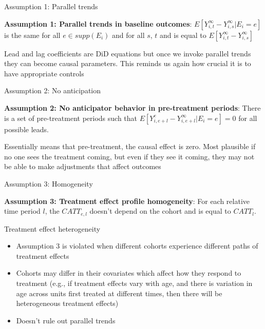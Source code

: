 \documentclass{beamer}
\begin{document}
\begin{frame}{Assumption 1: Parallel trends}

\textbf{Assumption 1: Parallel trends in baseline outcomes}: $E[Y^{\infty}_{i,t} - Y^{\infty}_{i,s} | E_i = e ]$ is the same for all $e \in supp(E_i)$ and for all $s$, $t$ and is equal to $E[Y^{\infty}_{i,t} - Y^{\infty}_{i,s} ]$

\bigskip

Lead and lag coefficients are DiD equations but once we invoke parallel trends they can become causal parameters.  This reminds us again how crucial it is to have  appropriate controls

\end{frame}


\begin{frame}{Assumption 2: No anticipation}

\textbf{Assumption 2: No anticipator behavior in pre-treatment periods}: There is a set of pre-treatment periods such that $E[Y_{i,e+l}^e - Y_{i,e+l}^{\infty} | E_i = e]=0$ for all possible leads.

\bigskip

Essentially means that pre-treatment, the causal effect is zero.  Most plausible if no one sees the treatment coming, but even if they see it coming, they may not be able to make adjustments that affect outcomes

\end{frame}


\begin{frame}{Assumption 3: Homogeneity}

\textbf{Assumption 3: Treatment effect profile homogeneity}: For each relative time period $l$, the $CATT_{e,l}$ doesn't depend on the cohort and is equal to $CATT_l$. 


\end{frame}

\begin{frame}{Treatment effect heterogeneity}

\begin{itemize}
\item Assumption 3 is violated when different cohorts experience different paths of treatment effects
\item Cohorts may differ in their covariates which affect how they respond to treatment (e.g., if treatment effects vary with age, and there is variation in age across units first treated at different times, then there will be heterogeneous treatment effects)
\item Doesn't rule out parallel trends
\end{itemize}

\end{frame}
\end{document}
